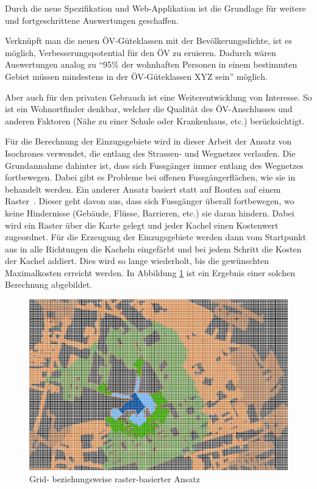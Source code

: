 Durch die neue Spezifikation und Web-Applikation ist die Grundlage für weitere und fortgeschrittene Auswertungen geschaffen.

Verknüpft man die neuen \acs{ÖV}-Güteklassen mit der Bevölkerungsdichte, ist es möglich, Verbesserungspotential für den \acs{ÖV} zu eruieren.
Dadurch wären Auswertungen analog zu "`95\% der wohnhaften Personen in einem bestimmten Gebiet müssen mindestens in der \acs{ÖV}-Güteklassen XYZ sein"' möglich.

Aber auch für den privaten Gebrauch ist eine Weiterentwicklung von Interesse.
So ist ein Wohnortfinder denkbar, welcher die Qualität des \acs{ÖV}-Anschlusses und anderen Faktoren (Nähe zu einer Schule oder Krankenhaus, etc.) berücksichtigt.

Für die Berechnung der Einzugsgebiete wird in dieser Arbeit der Ansatz von \glspl{Isochrone} verwendet, die entlang des Strassen- und Wegnetzes verlaufen.
Die Grundannahme dahinter ist, dass sich Fussgänger immer entlang des Wegnetzes fortbewegen.
Dabei gibt es Probleme bei offenen Fussgängerflächen, wie sie in~\cite{plaza_route} behandelt werden.
Ein anderer Ansatz basiert statt auf Routen auf einem Raster~\cite{pedestrian_accessibility_planning}. Dieser geht davon aus, dass sich Fussgänger überall fortbewegen, wo keine Hindernisse (Gebäude, Flüsse, Barrieren, etc.) sie daran hindern.
Dabei wird ein Raster über die Karte gelegt und jeder Kachel einen Kostenwert zugeordnet.
Für die Erzeugung der Einzugsgebiete werden dann vom Startpunkt aus in alle Richtungen die Kacheln eingefärbt und bei jedem Schritt die Kosten der Kachel addiert.
Dies wird so lange wiederholt, bis die gewünschten Maximalkosten erreicht werden.
In Abbildung \ref{fig:grid_based_approach} ist ein Ergebnis einer solchen Berechnung abgebildet.

\begin{figure}[ht]
    \centering
    \includegraphics[width=0.6\linewidth]{start/img/grid_based_approach.png}
    \caption[Grid- beziehungsweise raster-basierter Ansatz]{Grid- beziehungsweise raster-basierter Ansatz~\cite{pedestrian_accessibility_planning}}
    \label{fig:grid_based_approach}
\end{figure}

